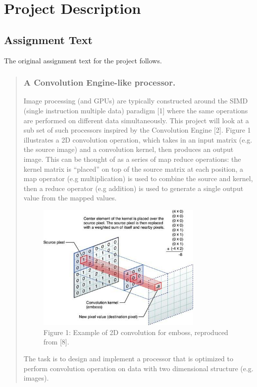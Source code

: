 \section{Project Description}

\subsection{Assignment Text} \label{subsec:assignment-text}
The original assignment text for the project follows.
\begin{quotation}
\mbox{}%
\subsubsection{A Convolution Engine-like processor.}
Image processing (and GPUs) are typically constructed around the SIMD (single instruction multiple data) paradigm [1]  where the same operations are performed on different data simultaneously.
This project will look at a sub set of such processors inspired by the Convolution Engine [2].
Figure 1 illustrates a 2D convolution operation, which takes in an input matrix (e.g. the source image) and a convolution kernel, then produces an output image.
This can be thought of as a series of map reduce operations: the kernel matrix is “placed” on top of the source matrix at each position, a map operator (e.g multiplication) is used to combine the source and kernel, then a reduce operator (e.g addition) is used to generate a single output value from the mapped values.

\begin{figure}[h!]
    \centering
    \includegraphics[width=8cm]{img/convolutionAssignment.jpg}
    \caption*{Figure 1: Example of 2D convolution for emboss, reproduced from [8].}
\end{figure}

The task is to design and implement a processor that is optimized to perform convolution operation on data with two dimensional structure (e.g. images).


\end{quotation}
